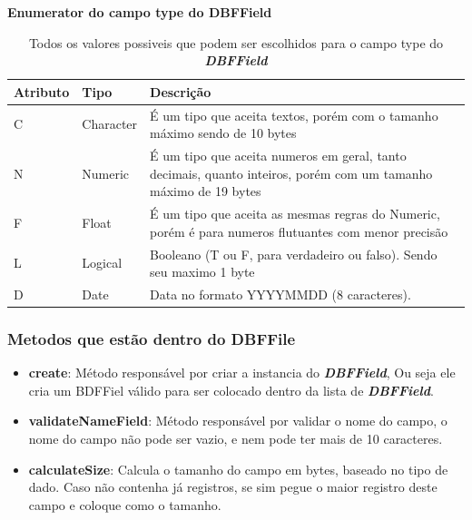 \begin{table}[H]
    \centering
    \textbf{Enumerator do campo type do DBFField}
    \begin{tabular}{|p{} | p{} | p{}|}
        \hline
        \textbf{Atributo} & \textbf{Tipo} & \textbf{Descrição} \\
        \hline
        C & Character & É um tipo que aceita textos, porém com o tamanho máximo sendo de 10 bytes \\
        \hline
        N & Numeric &  É um tipo que aceita numeros em geral, tanto decimais, quanto inteiros, porém com um tamanho máximo de 19 bytes \\
        \hline
        F & Float  & É um tipo que aceita as mesmas regras do Numeric, porém é para numeros flutuantes com menor precisão \\
        \hline
        L & Logical  & Booleano (T ou F, para verdadeiro ou falso). Sendo seu maximo 1 byte \\
        \hline
        D & Date  & Data no formato YYYYMMDD (8 caracteres). \\
        \hline
    \end{tabular}
    \caption{Todos os valores possiveis que podem ser escolhidos para o campo type do \textit{\textbf{DBFField}}}
    \label{tab:tabela_enumeracao_atributo_type}
\end{table}

\subsubsection{Metodos que estão dentro do DBFFile}
\begin{itemize}
    \item \textbf{create}: Método responsável por criar a instancia do \textit{\textbf{DBFField}}, Ou seja ele cria um BDFFiel válido para ser colocado dentro da lista de \textit{\textbf{DBFField}}.
    \item \textbf{validateNameField}: Método responsável por validar o nome do campo, o nome do campo não pode ser vazio, e nem pode ter mais de 10 caracteres. 
    \item \textbf{calculateSize}: Calcula o tamanho do campo em bytes, baseado no tipo de dado. Caso não contenha já registros, se sim pegue o maior registro deste campo e coloque como o tamanho.
\end{itemize}






